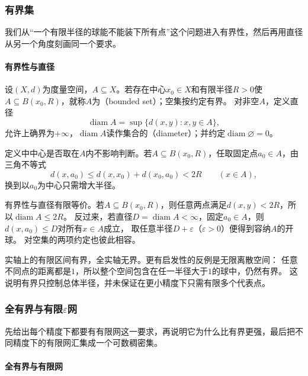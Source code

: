 \subsubsection{有界集}
\label{sec:metric-boundedness}

我们从“一个有限半径的球能不能装下所有点”这个问题进入有界性，然后再用直径从另一个角度刻画同一个要求。

\paragraph{有界性与直径}

\begin{definition}[有界集与直径]
\label{def:metric-bounded}
设$(X,d)$为度量空间，$A\subseteq X$。若存在中心$x_0\in X$和有限半径$R>0$使$A\subseteq B(x_0,R)$，就称$A$为（bounded set）；空集按约定有界。
对非空$A$，定义直径
\[
  \operatorname{diam}A=\sup\{d(x,y):x,y\in A\},
\]
允许上确界为$+\infty$，$\operatorname{diam}A$读作集合的（diameter）；并约定$\operatorname{diam}\varnothing=0$。
\end{definition}

定义中中心是否取在$A$内不影响判断。若$A\subseteq B(x_0,R)$，任取固定点$a_0\in A$，由三角不等式
\[
  d(x,a_0)\leq d(x,x_0)+d(x_0,a_0)<2R\qquad(x\in A),
\]
换到以$a_0$为中心只需增大半径。

有界性与直径有限等价。若$A\subseteq B(x_0,R)$，则任意两点满足$d(x,y)<2R$，所以$\operatorname{diam}A\leq2R$。
反过来，若直径$D=\operatorname{diam}A<\infty$，固定$a_0\in A$，则$d(x,a_0)\leq D$对所有$x\in A$成立，
取任意半径$D+\varepsilon$（$\varepsilon>0$）便得到容纳$A$的开球。
对空集的两项约定也彼此相容。

实轴上的有限区间有界，全实轴无界。更有启发性的反例是无限离散空间：
任意不同点的距离都是$1$，所以整个空间包含在任一半径大于$1$的球中，仍然有界。
这说明有界只控制总体半径，并未保证在更小精度下只需有限多个代表点。

\subsubsection{全有界与有限$\varepsilon$网}
\label{sec:metric-total-boundedness}

先给出每个精度下都要有有限网这一要求，再说明它为什么比有界更强，最后把不同精度下的有限网汇集成一个可数稠密集。

\paragraph{全有界与有限网}

